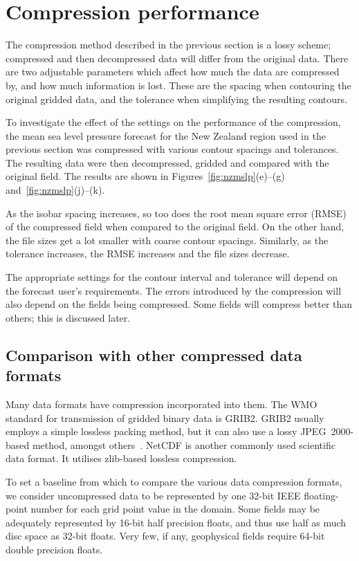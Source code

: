 \documentclass[12pt,a4paper]{article}
\begin{document}
\section*{Compression performance}
\label{sec:performance}

The compression method described in the previous section is a lossy scheme;
compressed and then decompressed data will differ from the original data. There
are two adjustable parameters which affect how much the data are compressed by,
and how much information is lost. These are the spacing when contouring the
original gridded data, and the tolerance when simplifying the resulting
contours.

To investigate the effect of the settings on the performance of the
compression, the mean sea level pressure forecast for the New Zealand region
used in the previous section was compressed with various contour spacings and
tolerances. The resulting data were then decompressed, gridded and compared
with the original field. The results are shown in
Figures~\ref{fig:nzmslp}(e)--(g) and~\ref{fig:nzmslp}(j)--(k).

As the isobar spacing increases, so too does the root mean square error (RMSE)
of the compressed field when compared to the original field. On the other hand,
the file sizes get a lot smaller with coarse contour spacings. Similarly, as
the tolerance increases, the RMSE increases and the file sizes decrease.

The appropriate settings for the contour interval and tolerance will depend on
the forecast user's requirements. The errors introduced by the compression will
also depend on the fields being compressed. Some fields will compress better
than others; this is discussed later.

\subsection*{Comparison with other compressed data formats}
\label{sec:compression_comparison}

Many data formats have compression incorporated into them. The WMO standard for
transmission of gridded binary data is GRIB2. GRIB2 usually employs a simple
lossless packing method, but it can also use a lossy JPEG~2000-based method,
amongst others~\citep[p. 143]{wmo2019b}. NetCDF is another commonly used
scientific data format. It utilises zlib-based lossless compression.

To set a baseline from which to compare the various data compression formats,
we consider uncompressed data to be represented by one 32-bit IEEE
floating-point number for each grid point value in the domain. Some fields may
be adequately represented by 16-bit half precision floats, and thus use half as
much disc space as 32-bit floats. Very few, if any, geophysical fields require
64-bit double precision floats.
\end{document}
